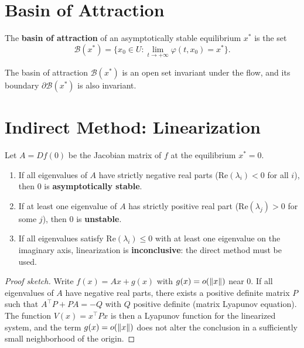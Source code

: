 \section{Basin of Attraction}

\begin{definition}
The \textbf{basin of attraction} of an asymptotically stable equilibrium
$x^*$ is the set
\[
    \mathcal{B}(x^*) = \{x_0 \in U : \lim_{t \to +\infty} \varphi(t, x_0) = x^*\}.
\]
\end{definition}

\begin{proposition}
The basin of attraction $\mathcal{B}(x^*)$ is an open set invariant under
the flow, and its boundary $\partial\mathcal{B}(x^*)$ is also invariant.
\end{proposition}

\section{Indirect Method: Linearization}

\begin{theorem}
\label{thm:lyap-indirect}
Let $A = Df(0)$ be the Jacobian matrix of $f$ at the equilibrium $x^* = 0$.
\begin{enumerate}
    \item If all eigenvalues of $A$ have strictly negative real parts
    ($\text{Re}(\lambda_i) < 0$ for all $i$), then $0$ is
    \textbf{asymptotically stable}.
    \item If at least one eigenvalue of $A$ has strictly positive real part
    ($\text{Re}(\lambda_j) > 0$ for some $j$), then $0$ is \textbf{unstable}.
    \item If all eigenvalues satisfy $\text{Re}(\lambda_i) \leq 0$ with at
    least one eigenvalue on the imaginary axis, linearization is
    \textbf{inconclusive}: the direct method must be used.
\end{enumerate}
\end{theorem}

\begin{proof}[Proof sketch]
Write $f(x) = Ax + g(x)$ with $g(x) = o(\left\| x \right\|)$ near $0$. If all
eigenvalues of $A$ have negative real parts, there exists a positive
definite matrix $P$ such that $A^\top P + PA = -Q$ with $Q$ positive
definite (matrix Lyapunov equation). The function $V(x) = x^\top P x$ is
then a Lyapunov function for the linearized system, and the term
$g(x) = o(\left\| x \right\|)$ does not alter the conclusion in a sufficiently small
neighborhood of the origin.
\end{proof}

